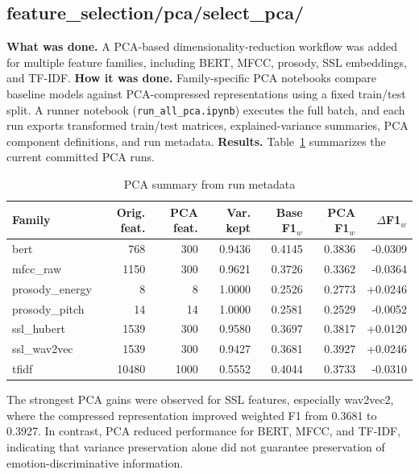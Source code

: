 \subsection{feature\_selection/pca/select\_pca/}
\textbf{What was done.} A PCA-based dimensionality-reduction workflow was added for multiple feature families, including BERT, MFCC, prosody, SSL embeddings, and TF-IDF.
\textbf{How it was done.} Family-specific PCA notebooks compare baseline models against PCA-compressed representations using a fixed train/test split. A runner notebook (\texttt{run\_all\_pca.ipynb}) executes the full batch, and each run exports transformed train/test matrices, explained-variance summaries, PCA component definitions, and run metadata.
\textbf{Results.} Table~\ref{tab:pca_results} summarizes the current committed PCA runs.
\begin{table}[h]
\centering
\caption{PCA summary from run metadata}
\label{tab:pca_results}
\begin{tabular}{lrrrrrr}
\hline
Family & Orig. feat. & PCA feat. & Var. kept & Base F1$_w$ & PCA F1$_w$ & $\Delta$F1$_w$ \\
\hline
bert & 768 & 300 & 0.9436 & 0.4145 & 0.3836 & -0.0309 \\
mfcc\_raw & 1150 & 300 & 0.9621 & 0.3726 & 0.3362 & -0.0364 \\
prosody\_energy & 8 & 8 & 1.0000 & 0.2526 & 0.2773 & +0.0246 \\
prosody\_pitch & 14 & 14 & 1.0000 & 0.2581 & 0.2529 & -0.0052 \\
ssl\_hubert & 1539 & 300 & 0.9580 & 0.3697 & 0.3817 & +0.0120 \\
ssl\_wav2vec & 1539 & 300 & 0.9427 & 0.3681 & 0.3927 & +0.0246 \\
tfidf & 10480 & 1000 & 0.5552 & 0.4044 & 0.3733 & -0.0310 \\
\hline
\end{tabular}
\end{table}
\noindent The strongest PCA gains were observed for SSL features, especially wav2vec2, where the compressed representation improved weighted F1 from 0.3681 to 0.3927. In contrast, PCA reduced performance for BERT, MFCC, and TF-IDF, indicating that variance preservation alone did not guarantee preservation of emotion-discriminative information.
